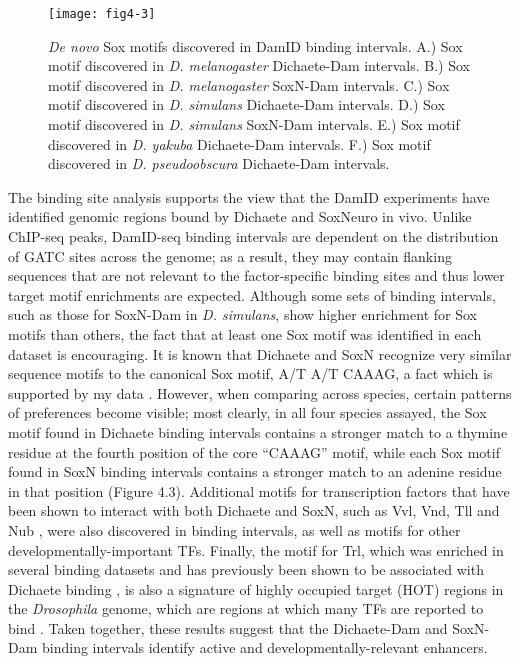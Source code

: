 \begin{figure}[ht]
	\centering
	\texttt{[image: fig4-3]}
	\caption{\emph{De novo} Sox motifs discovered in DamID binding intervals. A.) Sox motif discovered in \emph{D. melanogaster} Dichaete-Dam intervals. B.) Sox motif discovered in \emph{D. melanogaster} SoxN-Dam intervals. C.) Sox motif discovered in \emph{D. simulans} Dichaete-Dam intervals. D.) Sox motif discovered in \emph{D. simulans} SoxN-Dam intervals. E.) Sox motif discovered in \emph{D. yakuba} Dichaete-Dam intervals. F.) Sox motif discovered in \emph{D. pseudoobscura} Dichaete-Dam intervals.}
	\label{Figure 4.3}
\end{figure}

The binding site analysis supports the view that the DamID experiments have identified genomic regions bound by Dichaete and SoxNeuro in vivo. Unlike ChIP-seq peaks, DamID-seq binding intervals are dependent on the distribution of GATC sites across the genome; as a result, they may contain flanking sequences that are not relevant to the factor-specific binding sites and thus lower target motif enrichments are expected. Although some sets of binding intervals, such as those for SoxN-Dam in \emph{D. simulans}, show higher enrichment for Sox motifs than others, the fact that at least one Sox motif was identified in each dataset is encouraging. It is known that Dichaete and SoxN recognize very similar sequence motifs to the canonical Sox motif, A/T A/T CAAAG, a fact which is supported by my data \citep{aleksic_role_2013,ferrero_soxneuro_2014}. However, when comparing across species, certain patterns of preferences become visible; most clearly, in all four species assayed, the Sox motif found in Dichaete binding intervals contains a stronger match to a thymine residue at the fourth position of the core “CAAAG” motif, while each Sox motif found in SoxN binding intervals contains a stronger match to an adenine residue in that position (Figure 4.3). Additional motifs for transcription factors that have been shown to interact with both Dichaete and SoxN, such as Vvl, Vnd, Tll and Nub \citep{aleksic_role_2013,ferrero_soxneuro_2014,soriano_drosophila_1998}, were also discovered in binding intervals, as well as motifs for other developmentally-important TFs. Finally, the motif for Trl, which was enriched in several binding datasets and has previously been shown to be associated with Dichaete binding \citep{aleksic_role_2013}, is also a signature of highly occupied target (HOT) regions in the \emph{Drosophila} genome, which are regions at which many TFs are reported to bind \citep{kvon_hot_2012}. Taken together, these results suggest that the Dichaete-Dam and SoxN-Dam binding intervals identify active and developmentally-relevant enhancers.

